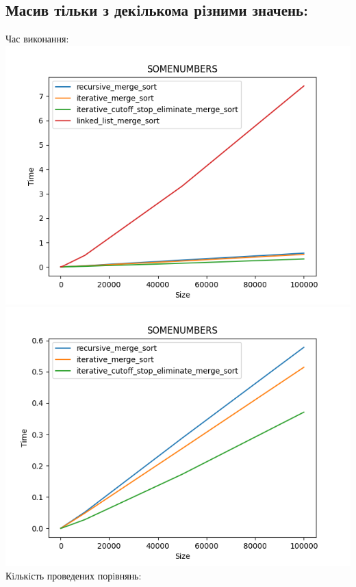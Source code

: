\documentclass{article}
\begin{document}
    \subsection{Масив тільки з декiлькома рiзними значень:}
    Час виконання:
    \newline
        \includegraphics[scale=0.5]{somenumbers_Time_4_sorts_6_numbers_50_100to100000.png}
        \includegraphics[scale=0.5]{somenumbers_Time_3_sorts_6_numbers_50_100to100000.png}
    \newline
    Кiлькiсть проведених порiвнянь:
    \newline
\end{document}
